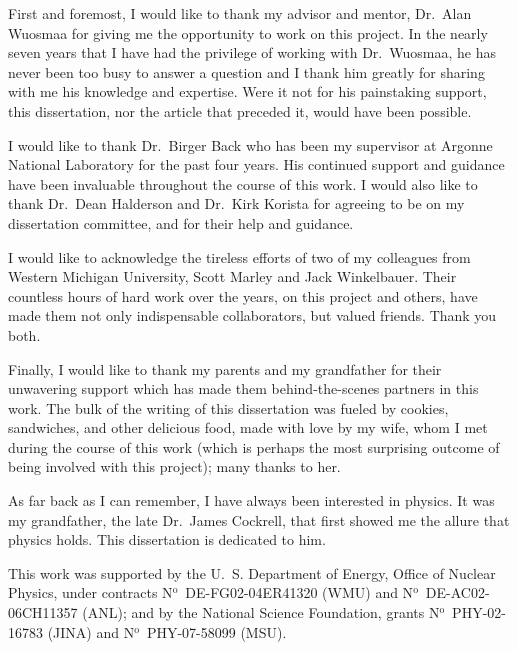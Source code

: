 First and foremost, I would like to thank my advisor and mentor, Dr.~Alan Wuosmaa for giving me the opportunity to work on this project.  In the nearly seven years that I have had the privilege of working with Dr.~Wuosmaa, he has never been too busy to answer a question and I thank him greatly for sharing with me his 
knowledge and expertise.  Were it not for his painstaking support, this dissertation, nor the article that preceded it, would have been possible.

I would like to thank Dr.~Birger Back who has been my supervisor at Argonne National Laboratory for the past four years.  His continued support and guidance have been invaluable throughout the course of this work.  I would also like to thank Dr.~Dean Halderson and Dr.~Kirk Korista for agreeing to be on my dissertation committee, and for their help and guidance.

I would like to %
acknowledge the tireless efforts of two of my colleagues from Western Michigan University, Scott Marley and Jack Winkelbauer.  Their countless hours of hard work over the years, on this project and others, have made them not only indispensable collaborators, but valued friends.  Thank you both.

Finally, I would like to thank %
my parents and my grandfather for their unwavering support which has made them behind-the-scenes partners in this work.  The bulk of the writing of this dissertation was fueled by cookies, sandwiches, and other delicious food, made with love by my wife, whom I met during the course of this work (which is perhaps the most surprising outcome of being involved with this project); many thanks to her.

As far back as I can remember, I have always been interested in physics.  It was my grandfather, the late Dr.~James Cockrell, that first showed me the allure that physics holds.  This dissertation is dedicated to him.

This work was supported by the U.\ S. Department of Energy,
Office of Nuclear Physics, under contracts N$^\textrm{o}$~DE-FG02-04ER41320 (WMU) 
and N$^\textrm{o}$~DE-AC02-06CH11357 (ANL); and by the National Science Foundation, grants N$^\textrm{o}$~PHY-02-16783  (JINA) and N$^\textrm{o}$~PHY-07-58099 (MSU).
